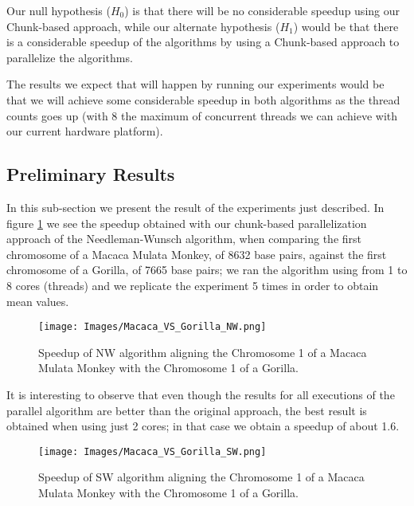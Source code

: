 \documentclass[journal]{IEEEtran}
\begin{document}
Our null hypothesis ($H_0$) is that there will be no considerable speedup using our Chunk-based approach, while our alternate hypothesis ($H_1$) would be that there is a considerable speedup of the algorithms by using a Chunk-based approach to parallelize the algorithms.

The results we expect that will happen by running our experiments would be that we will achieve some considerable speedup in both algorithms as the thread counts goes up (with 8 the maximum of concurrent threads we can achieve with our current hardware platform).

\subsection{Preliminary Results}

In this sub-section we present the result of the experiments just described. In figure \ref{fig:Macaca_VS_Gorilla_NW} we see the speedup obtained with our chunk-based parallelization approach of the Needleman-Wunsch algorithm, when comparing the first chromosome of a Macaca Mulata Monkey, of 8632 base pairs, against the first chromosome of a Gorilla, of 7665 base pairs; we ran the algorithm using from 1 to 8 cores (threads) and we replicate the experiment 5 times in order to obtain mean values. 

\begin{figure}[h]
  \begin{center}
    \texttt{[image: Images/Macaca\_VS\_Gorilla\_NW.png]}
  \end{center}
  \caption{Speedup of NW algorithm aligning the Chromosome 1 of a Macaca Mulata Monkey with the Chromosome 1 of a Gorilla.}
  \label{fig:Macaca_VS_Gorilla_NW}
\end{figure}

It is interesting to observe that even though the results for all executions of the parallel algorithm are better than the original approach, the best result is obtained when using just 2 cores; in that case we obtain a speedup of about 1.6.    

\begin{figure}[h]
  \begin{center}
    \texttt{[image: Images/Macaca\_VS\_Gorilla\_SW.png]}
  \end{center}
  \caption{Speedup of SW algorithm aligning the Chromosome 1 of a Macaca Mulata Monkey with the Chromosome 1 of a Gorilla.}
  \label{fig:Macaca_VS_Gorilla_SW}
\end{figure}
\end{document}
